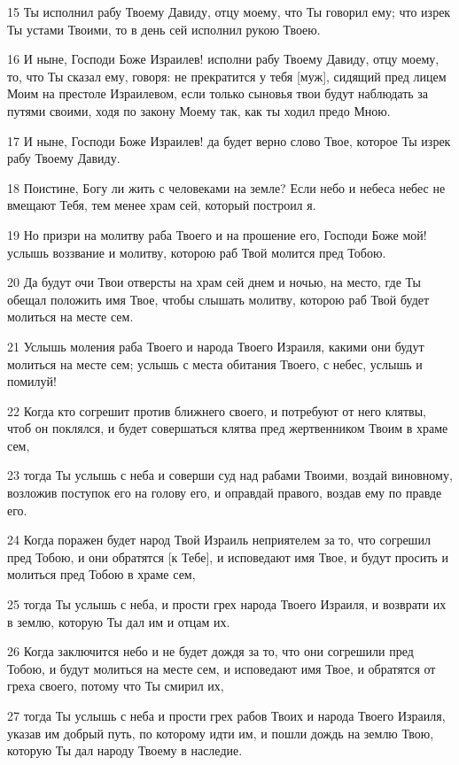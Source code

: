 \par 15 Ты исполнил рабу Твоему Давиду, отцу моему, что Ты говорил ему; что изрек Ты устами Твоими, то в день сей исполнил рукою Твоею.
\par 16 И ныне, Господи Боже Израилев! исполни рабу Твоему Давиду, отцу моему, то, что Ты сказал ему, говоря: не прекратится у тебя [муж], сидящий пред лицем Моим на престоле Израилевом, если только сыновья твои будут наблюдать за путями своими, ходя по закону Моему так, как ты ходил предо Мною.
\par 17 И ныне, Господи Боже Израилев! да будет верно слово Твое, которое Ты изрек рабу Твоему Давиду.
\par 18 Поистине, Богу ли жить с человеками на земле? Если небо и небеса небес не вмещают Тебя, тем менее храм сей, который построил я.
\par 19 Но призри на молитву раба Твоего и на прошение его, Господи Боже мой! услышь воззвание и молитву, которою раб Твой молится пред Тобою.
\par 20 Да будут очи Твои отверсты на храм сей днем и ночью, на место, где Ты обещал положить имя Твое, чтобы слышать молитву, которою раб Твой будет молиться на месте сем.
\par 21 Услышь моления раба Твоего и народа Твоего Израиля, какими они будут молиться на месте сем; услышь с места обитания Твоего, с небес, услышь и помилуй!
\par 22 Когда кто согрешит против ближнего своего, и потребуют от него клятвы, чтоб он поклялся, и будет совершаться клятва пред жертвенником Твоим в храме сем,
\par 23 тогда Ты услышь с неба и соверши суд над рабами Твоими, воздай виновному, возложив поступок его на голову его, и оправдай правого, воздав ему по правде его.
\par 24 Когда поражен будет народ Твой Израиль неприятелем за то, что согрешил пред Тобою, и они обратятся [к Тебе], и исповедают имя Твое, и будут просить и молиться пред Тобою в храме сем,
\par 25 тогда Ты услышь с неба, и прости грех народа Твоего Израиля, и возврати их в землю, которую Ты дал им и отцам их.
\par 26 Когда заключится небо и не будет дождя за то, что они согрешили пред Тобою, и будут молиться на месте сем, и исповедают имя Твое, и обратятся от греха своего, потому что Ты смирил их,
\par 27 тогда Ты услышь с неба и прости грех рабов Твоих и народа Твоего Израиля, указав им добрый путь, по которому идти им, и пошли дождь на землю Твою, которую Ты дал народу Твоему в наследие.
